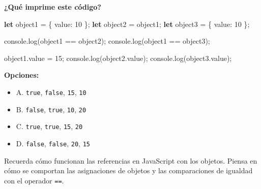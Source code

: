 \documentclass[
  letterpaper,
  DIV=11,
  numbers=noendperiod]{scrreprt}
\newenvironment{Shaded}{\begin{snugshade}}{\end{snugshade}}
\newcommand{\AttributeTok}[1]{\textcolor[rgb]{0.40,0.45,0.13}{#1}}
\newcommand{\BuiltInTok}[1]{\textcolor[rgb]{0.00,0.23,0.31}{#1}}
\newcommand{\DataTypeTok}[1]{\textcolor[rgb]{0.68,0.00,0.00}{#1}}
\newcommand{\DecValTok}[1]{\textcolor[rgb]{0.68,0.00,0.00}{#1}}
\newcommand{\FunctionTok}[1]{\textcolor[rgb]{0.28,0.35,0.67}{#1}}
\newcommand{\KeywordTok}[1]{\textcolor[rgb]{0.00,0.23,0.31}{\textbf{#1}}}
\newcommand{\NormalTok}[1]{\textcolor[rgb]{0.00,0.23,0.31}{#1}}
\newcommand{\OperatorTok}[1]{\textcolor[rgb]{0.37,0.37,0.37}{#1}}
\providecommand{\tightlist}{%
  \setlength{\itemsep}{0pt}\setlength{\parskip}{0pt}}
\begin{document}
\textbf{¿Qué imprime este código?}

\begin{Shaded}
\begin{Highlighting}[]
\KeywordTok{let}\NormalTok{ object1 }\OperatorTok{=}\NormalTok{ \{ }\DataTypeTok{value}\OperatorTok{:} \DecValTok{10}\NormalTok{ \}}\OperatorTok{;}
\KeywordTok{let}\NormalTok{ object2 }\OperatorTok{=}\NormalTok{ object1}\OperatorTok{;}
\KeywordTok{let}\NormalTok{ object3 }\OperatorTok{=}\NormalTok{ \{ }\DataTypeTok{value}\OperatorTok{:} \DecValTok{10}\NormalTok{ \}}\OperatorTok{;}

\BuiltInTok{console}\OperatorTok{.}\FunctionTok{log}\NormalTok{(object1 }\OperatorTok{==}\NormalTok{ object2)}\OperatorTok{;}
\BuiltInTok{console}\OperatorTok{.}\FunctionTok{log}\NormalTok{(object1 }\OperatorTok{==}\NormalTok{ object3)}\OperatorTok{;}

\NormalTok{object1}\OperatorTok{.}\AttributeTok{value} \OperatorTok{=} \DecValTok{15}\OperatorTok{;}
\BuiltInTok{console}\OperatorTok{.}\FunctionTok{log}\NormalTok{(object2}\OperatorTok{.}\AttributeTok{value}\NormalTok{)}\OperatorTok{;}
\BuiltInTok{console}\OperatorTok{.}\FunctionTok{log}\NormalTok{(object3}\OperatorTok{.}\AttributeTok{value}\NormalTok{)}\OperatorTok{;}
\end{Highlighting}
\end{Shaded}

\textbf{Opciones:}

\begin{itemize}
\tightlist
\item
  A. \texttt{true}, \texttt{false}, \texttt{15}, \texttt{10}
\item
  B. \texttt{false}, \texttt{true}, \texttt{10}, \texttt{20}
\item
  C. \texttt{true}, \texttt{true}, \texttt{15}, \texttt{20}
\item
  D. \texttt{false}, \texttt{false}, \texttt{20}, \texttt{15}
\end{itemize}

\begin{tcolorbox}[enhanced jigsaw, left=2mm, toprule=.15mm, leftrule=.75mm, breakable, colback=white, coltitle=black, bottomtitle=1mm, arc=.35mm, rightrule=.15mm, colframe=quarto-callout-tip-color-frame, opacitybacktitle=0.6, toptitle=1mm, opacityback=0, titlerule=0mm, title=\textcolor{quarto-callout-tip-color}{\faLightbulb}\hspace{0.5em}{Pista}, bottomrule=.15mm, colbacktitle=quarto-callout-tip-color!10!white]

Recuerda cómo funcionan las referencias en JavaScript con los objetos.
Piensa en cómo se comportan las asignaciones de objetos y las
comparaciones de igualdad con el operador \texttt{==}.

\end{tcolorbox}
\end{document}
